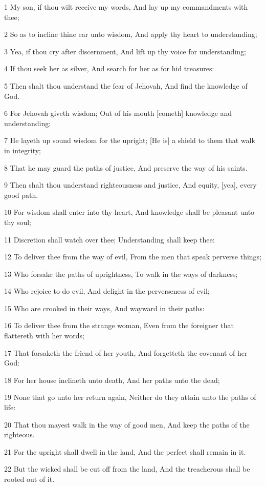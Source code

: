 \par 1 My son, if thou wilt receive my words, And lay up my commandments with thee;
\par 2 So as to incline thine ear unto wisdom, And apply thy heart to understanding;
\par 3 Yea, if thou cry after discernment, And lift up thy voice for understanding;
\par 4 If thou seek her as silver, And search for her as for hid treasures:
\par 5 Then shalt thou understand the fear of Jehovah, And find the knowledge of God.
\par 6 For Jehovah giveth wisdom; Out of his mouth [cometh] knowledge and understanding:
\par 7 He layeth up sound wisdom for the upright; [He is] a shield to them that walk in integrity;
\par 8 That he may guard the paths of justice, And preserve the way of his saints.
\par 9 Then shalt thou understand righteousness and justice, And equity, [yea], every good path.
\par 10 For wisdom shall enter into thy heart, And knowledge shall be pleasant unto thy soul;
\par 11 Discretion shall watch over thee; Understanding shall keep thee:
\par 12 To deliver thee from the way of evil, From the men that speak perverse things;
\par 13 Who forsake the paths of uprightness, To walk in the ways of darkness;
\par 14 Who rejoice to do evil, And delight in the perverseness of evil;
\par 15 Who are crooked in their ways, And wayward in their paths:
\par 16 To deliver thee from the strange woman, Even from the foreigner that flattereth with her words;
\par 17 That forsaketh the friend of her youth, And forgetteth the covenant of her God:
\par 18 For her house inclineth unto death, And her paths unto the dead;
\par 19 None that go unto her return again, Neither do they attain unto the paths of life:
\par 20 That thou mayest walk in the way of good men, And keep the paths of the righteous.
\par 21 For the upright shall dwell in the land, And the perfect shall remain in it.
\par 22 But the wicked shall be cut off from the land, And the treacherous shall be rooted out of it.


